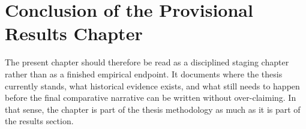 \section{Conclusion of the Provisional Results Chapter}

The present chapter should therefore be read as a disciplined staging chapter rather than as a finished empirical endpoint. It documents where the thesis currently stands, what historical evidence exists, and what still needs to happen before the final comparative narrative can be written without over-claiming. In that sense, the chapter is part of the thesis methodology as much as it is part of the results section.

